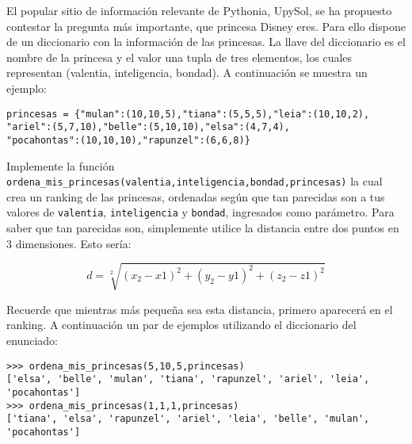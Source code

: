 \documentclass[11pt,spanish,letterpaper]{article}
\begin{document}
El popular sitio de información relevante de Pythonia, UpySol, se ha propuesto contestar la pregunta más importante, que princesa Disney eres. Para ello dispone de un diccionario con la información de las princesas. La llave del diccionario es el nombre de la princesa y el valor una tupla de tres elementos, los cuales representan (valentia, inteligencia, bondad). A continuación se muestra un ejemplo:

\begin{lstlisting}[language=testcase, frame=single]
princesas = {"mulan":(10,10,5),"tiana":(5,5,5),"leia":(10,10,2),
"ariel":(5,7,10),"belle":(5,10,10),"elsa":(4,7,4),
"pocahontas":(10,10,10),"rapunzel":(6,6,8)}
 \end{lstlisting}
 
Implemente la función \texttt{ordena\_mis\_princesas(valentia,inteligencia,bondad,princesas)} la cual crea un ranking de las princesas, ordenadas según que tan parecidas son a tus valores de  \texttt{valentia},  \texttt{inteligencia} y  \texttt{bondad}, ingresados como parámetro. Para saber que tan parecidas son, simplemente utilice la distancia entre dos puntos en 3 dimensiones. Esto sería:

$$d=\sqrt[2]{(x_2-x1)^2+(y_2-y1)^2+(z_2-z1)^2}$$


Recuerde que mientras más pequeña sea esta distancia, primero aparecerá en el ranking. A continuación un par de ejemplos utilizando el diccionario del enunciado:

 \begin{lstlisting}[language=testcase, frame=single]
>>> ordena_mis_princesas(5,10,5,princesas)
['elsa', 'belle', 'mulan', 'tiana', 'rapunzel', 'ariel', 'leia', 
'pocahontas']
>>> ordena_mis_princesas(1,1,1,princesas)
['tiana', 'elsa', 'rapunzel', 'ariel', 'leia', 'belle', 'mulan', 
'pocahontas']
 \end{lstlisting}
\end{document}
